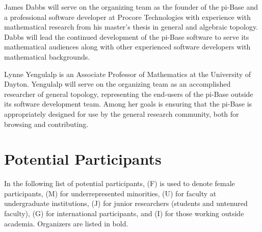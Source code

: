 \documentclass{amsart}
\newcommand{\TODO}[1]{\textcolor{red}{(TODO: #1)}}
\begin{document}
James Dabbs will serve on the organizing team as the founder of the pi-Base
and a professional software developer at Procore Technologies 
with experience with mathematical
research from his master's thesis in general and algebraic topology.
Dabbs will lead the continued development of the pi-Base software to
serve its mathematical audiences along with other experienced software
developers with mathematical backgrounds.

Lynne Yengulalp is an Associate Professor of Mathematics at the
University of Dayton. Yengulalp will serve on the organizing team as an accomplished researcher
of general topology, representing the end-users of the pi-Base outside
its software development team.
Among her goals is ensuring that the pi-Base is appropriately designed for
use by the general research community, both for browsing and contributing.


\section{Potential Participants}

In the following list of potential participants, (F) is used to denote
female participants, (M) for underrepresented minorities, (U) for
faculty at undergraduate institutions, (J) for junior researchers
(students and untenured faculty), (G) for international participants, 
and (I) for those working
outside academia. Organizers are listed in bold.
\end{document}
